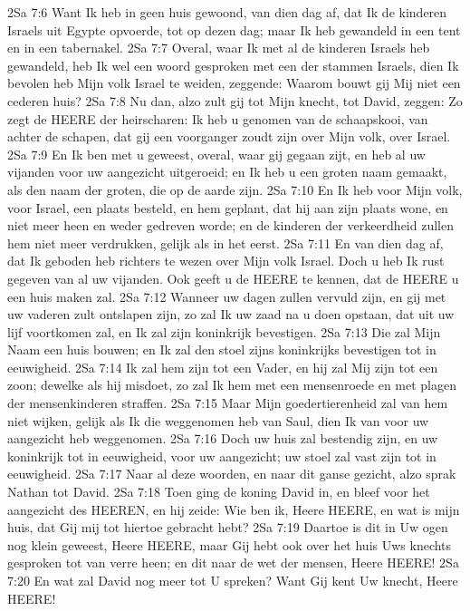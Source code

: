 2Sa 7:6  Want Ik heb in geen huis gewoond, van dien dag af, dat Ik de kinderen Israels uit Egypte opvoerde, tot op dezen dag; maar Ik heb gewandeld in een tent en in een tabernakel.
2Sa 7:7  Overal, waar Ik met al de kinderen Israels heb gewandeld, heb Ik wel een woord gesproken met een der stammen Israels, dien Ik bevolen heb Mijn volk Israel te weiden, zeggende: Waarom bouwt gij Mij niet een cederen huis?
2Sa 7:8  Nu dan, alzo zult gij tot Mijn knecht, tot David, zeggen: Zo zegt de HEERE der heirscharen: Ik heb u genomen van de schaapskooi, van achter de schapen, dat gij een voorganger zoudt zijn over Mijn volk, over Israel.
2Sa 7:9  En Ik ben met u geweest, overal, waar gij gegaan zijt, en heb al uw vijanden voor uw aangezicht uitgeroeid; en Ik heb u een groten naam gemaakt, als den naam der groten, die op de aarde zijn.
2Sa 7:10  En Ik heb voor Mijn volk, voor Israel, een plaats besteld, en hem geplant, dat hij aan zijn plaats wone, en niet meer heen en weder gedreven worde; en de kinderen der verkeerdheid zullen hem niet meer verdrukken, gelijk als in het eerst.
2Sa 7:11  En van dien dag af, dat Ik geboden heb richters te wezen over Mijn volk Israel. Doch u heb Ik rust gegeven van al uw vijanden. Ook geeft u de HEERE te kennen, dat de HEERE u een huis maken zal.
2Sa 7:12  Wanneer uw dagen zullen vervuld zijn, en gij met uw vaderen zult ontslapen zijn, zo zal Ik uw zaad na u doen opstaan, dat uit uw lijf voortkomen zal, en Ik zal zijn koninkrijk bevestigen.
2Sa 7:13  Die zal Mijn Naam een huis bouwen; en Ik zal den stoel zijns koninkrijks bevestigen tot in eeuwigheid.
2Sa 7:14  Ik zal hem zijn tot een Vader, en hij zal Mij zijn tot een zoon; dewelke als hij misdoet, zo zal Ik hem met een mensenroede en met plagen der mensenkinderen straffen.
2Sa 7:15  Maar Mijn goedertierenheid zal van hem niet wijken, gelijk als Ik die weggenomen heb van Saul, dien Ik van voor uw aangezicht heb weggenomen.
2Sa 7:16  Doch uw huis zal bestendig zijn, en uw koninkrijk tot in eeuwigheid, voor uw aangezicht; uw stoel zal vast zijn tot in eeuwigheid.
2Sa 7:17  Naar al deze woorden, en naar dit ganse gezicht, alzo sprak Nathan tot David.
2Sa 7:18  Toen ging de koning David in, en bleef voor het aangezicht des HEEREN, en hij zeide: Wie ben ik, Heere HEERE, en wat is mijn huis, dat Gij mij tot hiertoe gebracht hebt?
2Sa 7:19  Daartoe is dit in Uw ogen nog klein geweest, Heere HEERE, maar Gij hebt ook over het huis Uws knechts gesproken tot van verre heen; en dit naar de wet der mensen, Heere HEERE!
2Sa 7:20  En wat zal David nog meer tot U spreken? Want Gij kent Uw knecht, Heere HEERE!
